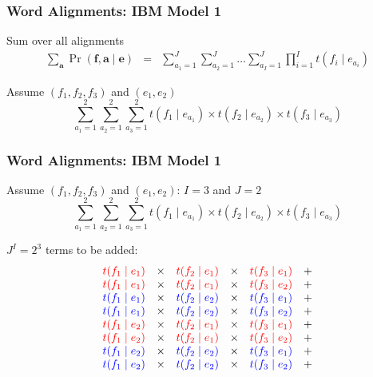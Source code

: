 \begin{frame}
\frametitle{Word Alignments: IBM Model 1}
\begin{block}{Sum over all alignments}
\begin{eqnarray*}
\sum_{\textbf{a}} \Pr(\textbf{f}, \textbf{a} \mid \textbf{e}) & = & 
\sum_{a_1 = 1}^J \sum_{a_2 = 1}^J \ldots \sum_{a_I = 1}^J \prod_{i=1}^I t(f_i \mid e_{a_i}) 
\end{eqnarray*}
\end{block}\pause
\begin{block}{Assume $(f_1, f_2, f_3)$ and $(e_1, e_2)$}
\[ \sum_{a_1=1}^2 \sum_{a_2=1}^2 \sum_{a_3=1}^2 t(f_1 \mid e_{a_1}) \times t(f_2 \mid e_{a_2}) \times t(f_3 \mid e_{a_3}) \]
\end{block}
\end{frame}

\begin{frame}
\frametitle{Word Alignments: IBM Model 1}
\begin{block}{Assume $(f_1, f_2, f_3)$ and $(e_1, e_2)$: $I=3$ and $J=2$}
\[ \sum_{a_1=1}^2 \sum_{a_2=1}^2 \sum_{a_3=1}^2 t(f_1 \mid e_{a_1}) \times t(f_2 \mid e_{a_2}) \times t(f_3 \mid e_{a_3}) \]
\end{block}
\begin{block}{$J^I = 2^3$ terms to be added:}
\[ 
\begin{array}{cccccc}
\color{red} t(f_1 \mid e_1) & \times & \color{red} t(f_2 \mid e_1) & \times & \color{red} t(f_3 \mid e_1) & + \\
\color{red} t(f_1 \mid e_1) & \times & \color{red} t(f_2 \mid e_1) & \times & \color{red} t(f_3 \mid e_2) & + \\
\color{blue} t(f_1 \mid e_1) & \times & \color{blue} t(f_2 \mid e_2) & \times & \color{blue} t(f_3 \mid e_1) & + \\
\color{blue} t(f_1 \mid e_1) & \times & \color{blue} t(f_2 \mid e_2) & \times & \color{blue} t(f_3 \mid e_2) & + \\
\color{red} t(f_1 \mid e_2) & \times & \color{red} t(f_2 \mid e_1) & \times & \color{red} t(f_3 \mid e_1) & + \\
\color{red} t(f_1 \mid e_2) & \times & \color{red} t(f_2 \mid e_1) & \times & \color{red} t(f_3 \mid e_2) & + \\
\color{blue} t(f_1 \mid e_2) & \times & \color{blue} t(f_2 \mid e_2) & \times & \color{blue} t(f_3 \mid e_1) & + \\
\color{blue} t(f_1 \mid e_2) & \times & \color{blue} t(f_2 \mid e_2) & \times & \color{blue} t(f_3 \mid e_2) & + \\
\end{array}
\]
\end{block}
\end{frame}

